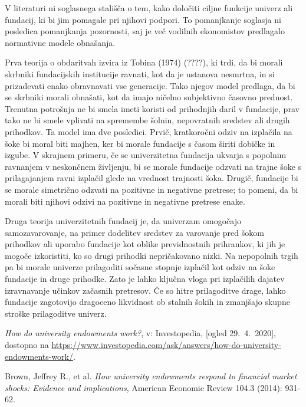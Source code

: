 \documentclass[12pt, a4paper]{article}
\begin{document}
V literaturi ni soglasnega stališča o tem, kako določiti ciljne funkcije univerz ali fundacij, ki bi jim pomagale pri njihovi podpori. To pomanjkanje soglasja ni posledica pomanjkanja pozornosti, saj je več vodilnih ekonomistov predlagalo normativne modele obnašanja. 

Prva teorija o obdaritvah izvira iz Tobina (1974) (????), ki trdi, da bi morali skrbniki fundacijskih institucije ravnati, kot da je ustanova nesmrtna, in si prizadevati enako obravnavati vse generacije. Tako njegov model predlaga, da bi se skrbniki morali obnašati, kot da imajo ničelno subjektivno časovno prednost. Trenutna potrošnja ne bi smela imeti koristi od prihodnjih daril v fundacije, prav tako ne bi smele vplivati na spremembe šolnin, nepovratnih sredstev ali drugih prihodkov. Ta model ima dve posledici. Prvič, kratkoročni odziv na izplačila na šoke bi moral biti majhen, ker bi morale fundacije s časom širiti dobičke in izgube. V skrajnem primeru, če se univerzitetna fundacija ukvarja s popolnim ravnanjem v neskončnem življenju, bi se morale fundacije odzvati na trajne šoke s prilagajanjem ravni izplačil glede na vrednost trajnosti šoka. Drugič, fundacije bi se morale simetrično odzvati na pozitivne in negativne pretrese; to pomeni, da bi morali biti njihovi odzivi na pozitivne in negativne pretrese enake.

Druga teorija univerzitetnih fundacij je, da univerzam omogočajo samozavarovanje, na primer dodelitev sredstev za varovanje pred šokom prihodkov ali uporabo fundacije kot oblike previdnostnih prihrankov, ki jih je mogoče izkoristiti, ko so drugi prihodki nepričakovano nizki. Na nepopolnih trgih pa bi morale univerze prilagoditi sočasne stopnje izplačil kot odziv na šoke fundacije in druge prihodke. Zato je lahko ključna vloga pri izplačilih dajatev izravnavanje učinkov začasnih pretresov. Če so hitre prilagoditve drage, lahko fundacije zagotovijo dragoceno likvidnost ob stalnih šokih in zmanjšajo skupne stroške prilagoditve univerz. \cite{soki}

\newpage
\begin{thebibliography}{99}

\emph{How do university endowments work?}, v: Investopedia, [ogled 29.~4.~2020], dostopno na \url{https://www.investopedia.com/ask/answers/how-do-university-endowments-work/}.

Brown, Jeffrey R., et al. \emph{How university endowments respond to financial market shocks: Evidence and implications}, American Economic Review 104.3 (2014): 931-62.


\end{thebibliography}
\end{document}
